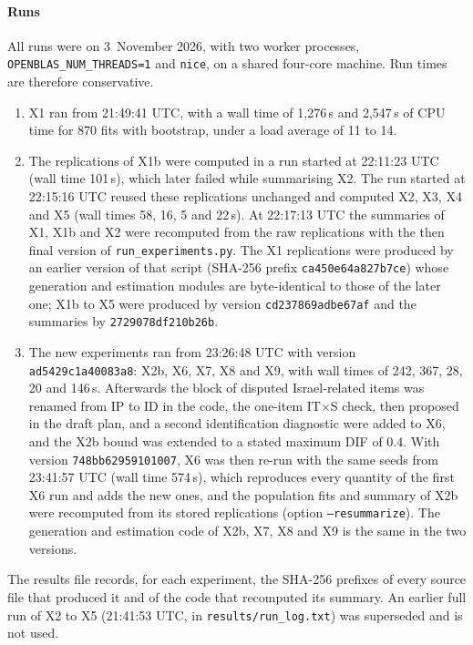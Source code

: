 \paragraph{Runs}
All runs were on 3~November 2026, with two worker processes, \texttt{OPENBLAS\_NUM\_THREADS=1} and \texttt{nice}, on a shared four-core machine. Run times are therefore conservative.
\begin{enumerate}[(1)]
  \item X1 ran from 21:49:41 UTC, with a wall time of 1{,}276\,s and 2{,}547\,s of CPU time for 870 fits with bootstrap, under a load average of 11 to 14.
  \item The replications of X1b were computed in a run started at 22:11:23 UTC (wall time 101\,s), which later failed while summarising X2. The run started at 22:15:16 UTC reused these replications unchanged and computed X2, X3, X4 and X5 (wall times 58, 16, 5 and 22\,s). At 22:17:13 UTC the summaries of X1, X1b and X2 were recomputed from the raw replications with the then final version of \texttt{run\_experiments.py}. The X1 replications were produced by an earlier version of that script (SHA-256 prefix \texttt{ca450e64a827b7ce}) whose generation and estimation modules are byte-identical to those of the later one; X1b to X5 were produced by version \texttt{cd237869adbe67af} and the summaries by \texttt{2729078df210b26b}.
  \item The new experiments ran from 23:26:48 UTC with version \texttt{ad5429c1a40083a8}: X2b, X6, X7, X8 and X9, with wall times of 242, 367, 28, 20 and 146\,s. Afterwards the block of disputed Israel-related items was renamed from IP to ID in the code, the one-item IT$\times$S check, then proposed in the draft plan, and a second identification diagnostic were added to X6, and the X2b bound was extended to a stated maximum DIF of $0.4$. With version \texttt{748bb62959101007}, X6 was then re-run with the same seeds from 23:41:57 UTC (wall time 574\,s), which reproduces every quantity of the first X6 run and adds the new ones, and the population fits and summary of X2b were recomputed from its stored replications (option \texttt{--resummarize}). The generation and estimation code of X2b, X7, X8 and X9 is the same in the two versions.
\end{enumerate}
The results file records, for each experiment, the SHA-256 prefixes of every source file that produced it and of the code that recomputed its summary. An earlier full run of X2 to X5 (21:41:53 UTC, in \texttt{results/run\_log.txt}) was superseded and is not used.

